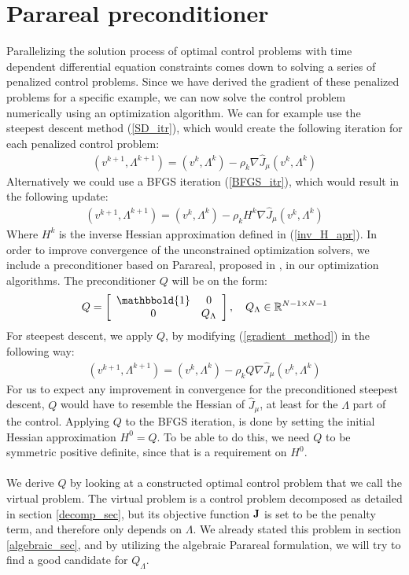 \section{Parareal preconditioner} \label{pc sec}
Parallelizing the solution process of optimal control problems with time dependent differential equation constraints comes down to solving a series of penalized control problems. Since we have derived the gradient of these penalized problems for a specific example, we can now solve the control problem numerically using an optimization algorithm. We can for example use the steepest descent method (\ref{SD_itr}), which would create the following iteration for each penalized control problem:
\begin{align}
(v^{k+1},\Lambda^{k+1}) = (v^{k},\Lambda^{k}) -\rho_k\nabla\hat{J}_{\mu}(v^{k},\Lambda^{k}) \label{gradient_method}
\end{align}
Alternatively we could use a BFGS iteration (\ref{BFGS_itr}), which would result in the following update:
\begin{align}
(v^{k+1},\Lambda^{k+1}) = (v^{k},\Lambda^{k}) -\rho_kH^{k}\nabla\hat{J}_{\mu}(v^{k},\Lambda^{k}) \label{bfgs_method}
\end{align}
Where $H^k$ is the inverse Hessian approximation defined in (\ref{inv_H_apr}). In order to improve convergence of the unconstrained optimization solvers, we include a preconditioner based on Parareal, proposed in \cite{maday2002parareal}, in our optimization algorithms. The preconditioner $Q$ will be on the form:
\begin{align}
Q = \left[ \begin{array}{cc}
	\mathbbold{1} & 0 \\
	0 & Q_{\Lambda} \\
	\end{array} \right],\quad Q_{\Lambda}\in\mathbb{R}^{N-1\times N-1} \label{PC_form}
\end{align} 
For steepest descent, we apply $Q$, by modifying (\ref{gradient_method}) in the following way:
\begin{align}
(v^{k+1},\Lambda^{k+1}) = (v^{k},\Lambda^{k}) -\rho_kQ\nabla\hat{J}_{\mu}(v^{k},\Lambda^{k}) \label{gradient_method2}
\end{align}
For us to expect any improvement in convergence for the preconditioned steepest descent, $Q$ would have to resemble the Hessian of $\hat{J}_{\mu}$, at least for the $\Lambda$ part of the control. Applying $Q$ to the BFGS iteration, is done by setting the initial Hessian approximation $H^0=Q$. To be able to do this, we need $Q$ to be symmetric positive definite, since that is a requirement on $H^0$. 
\\
\\
We derive $Q$ by looking at a constructed optimal control problem that we call the virtual problem. The virtual problem is a control problem decomposed as detailed in section \ref{decomp_sec}, but its objective function $\bold J$ is set to be the penalty term, and therefore only depends on $\Lambda$. We already stated this problem in section \ref{algebraic_sec}, and by utilizing the algebraic Parareal formulation, we will try to find a good candidate for $Q_{\Lambda}$.
